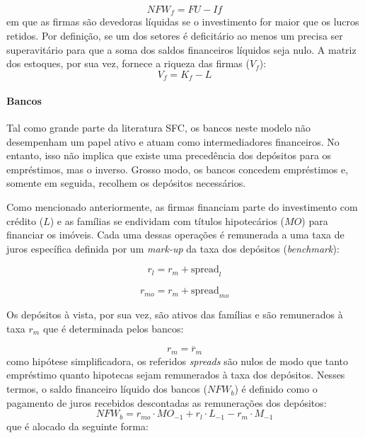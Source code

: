 \begin{equation}
    NFW_f = FU - If
\end{equation}
em que as firmas são devedoras líquidas se o investimento for maior que os lucros retidos. Por definição, se um dos setores é deficitário ao menos um precisa ser superavitário para que a soma dos saldos financeiros líquidos seja nulo. A matriz dos estoques, por sua vez, fornece a riqueza das firmas ($V_f$):
\begin{equation}
    V_f = K_f - L
\end{equation}

\paragraph*{Bancos} Tal como grande parte da literatura SFC, os bancos neste modelo não desempenham um papel ativo e atuam como intermediadores financeiros. No entanto, isso não implica que existe uma precedência dos depósitos para os empréstimos, mas o inverso. Grosso modo, os bancos concedem empréstimos e, somente em seguida, recolhem os depósitos necessários. 

Como mencionado anteriormente, as firmas financiam parte do investimento com crédito ($L$) e as famílias se endividam com títulos hipotecários ($MO$) para financiar os imóveis. Cada uma dessas operações é remunerada a uma taxa de juros específica definida por um \textit{mark-up} da taxa dos depósitos (\textit{benchmark}):

\begin{equation}
    r_l = r_m + \text{spread}_l
\end{equation}

\begin{equation}
    r_{mo} = r_m + \text{spread}_{mo}
\end{equation}

Os depósitos à vista, por sua vez, são ativos das famílias e são remunerados à taxa $r_m$ que é determinada pelos bancos:

\begin{equation}
    r_m = \overline r_m
\end{equation}
como hipótese simplificadora, os referidos \textit{spreads} são nulos de modo que tanto empréstimo quanto hipotecas sejam remunerados à taxa dos depósitos. Nesses termos, o saldo financeiro líquido dos bancos ($NFW_b$) é definido como o pagamento de juros recebidos descontadas as remunerações dos depósitos:
\begin{equation}
    NFW_b = r_{mo}\cdot MO_{-1} + r_l\cdot L_{-1} - r_m\cdot M_{-1}
\end{equation}
que é alocado da seguinte forma:

